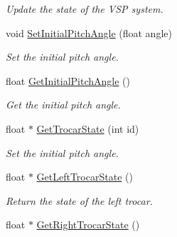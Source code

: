 \begin{DoxyCompactItemize}
\begin{DoxyCompactList}\small\item\em Update the state of the VSP system. \item\end{DoxyCompactList}\item 
\hypertarget{classvtkIHP_a6d10b7cac5ea2ce217358928749653b5}{
void \hyperlink{classvtkIHP_a6d10b7cac5ea2ce217358928749653b5}{SetInitialPitchAngle} (float angle)}
\label{classvtkIHP_a6d10b7cac5ea2ce217358928749653b5}

\begin{DoxyCompactList}\small\item\em Set the initial pitch angle. \item\end{DoxyCompactList}\item 
\hypertarget{classvtkIHP_a9ad07d98209de013625500eb841a56d4}{
float \hyperlink{classvtkIHP_a9ad07d98209de013625500eb841a56d4}{GetInitialPitchAngle} ()}
\label{classvtkIHP_a9ad07d98209de013625500eb841a56d4}

\begin{DoxyCompactList}\small\item\em Get the initial pitch angle. \item\end{DoxyCompactList}\item 
float $\ast$ \hyperlink{classvtkIHP_aea98689cc76883453f1b0099609cdaac}{GetTrocarState} (int id)
\begin{DoxyCompactList}\small\item\em Set the initial pitch angle. \item\end{DoxyCompactList}\item 
\hypertarget{classvtkIHP_a40db49901c5293fe66c97c9442d13ae0}{
float $\ast$ \hyperlink{classvtkIHP_a40db49901c5293fe66c97c9442d13ae0}{GetLeftTrocarState} ()}
\label{classvtkIHP_a40db49901c5293fe66c97c9442d13ae0}

\begin{DoxyCompactList}\small\item\em Return the state of the left trocar. \item\end{DoxyCompactList}\item 
\hypertarget{classvtkIHP_a4c11f6785733b96916b47a0b47fc2a81}{
float $\ast$ \hyperlink{classvtkIHP_a4c11f6785733b96916b47a0b47fc2a81}{GetRightTrocarState} ()}
\label{classvtkIHP_a4c11f6785733b96916b47a0b47fc2a81}


\end{DoxyCompactItemize}
